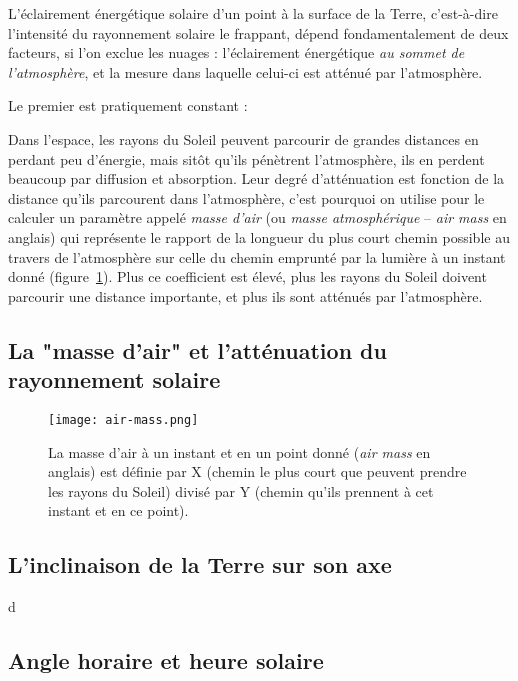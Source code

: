 \documentclass[12pt]{article}
\begin{document}
L'éclairement énergétique solaire d'un point à la surface de la Terre, c'est-à-dire l'intensité du rayonnement solaire le frappant, dépend fondamentalement de deux facteurs, si l'on exclue les nuages : l'éclairement énergétique \emph{au sommet de l'atmosphère}, et la mesure dans laquelle celui-ci est atténué par l'atmosphère.

Le premier est pratiquement constant : 

Dans l'espace, les rayons du Soleil peuvent parcourir de grandes distances en perdant peu d'énergie, mais sitôt qu'ils pénètrent l'atmosphère, ils en perdent beaucoup par diffusion et absorption.
Leur degré d'atténuation est fonction de la distance qu'ils parcourent dans l'atmosphère, c'est pourquoi on utilise pour le calculer un paramètre appelé \emph{masse d'air} (ou \emph{masse atmosphérique} -- \textit{air mass} en anglais) \cite{air_mass_wiki} qui représente le rapport de la longueur du plus court chemin possible au travers de l'atmosphère sur celle du chemin emprunté par la lumière à un instant donné (figure~\ref{fig:air-mass}). Plus ce coefficient est élevé, plus les rayons du Soleil doivent parcourir une distance importante, et plus ils sont atténués par l'atmosphère.

\subsection{La "masse d'air" et l'atténuation du rayonnement solaire}


\begin{figure}[!ht]
	\centerline{\texttt{[image: air-mass.png]}}
	\caption{La masse d'air à un instant et en un point donné (\textit{air mass} en anglais) est définie par X (chemin le plus court que peuvent prendre les rayons du Soleil) divisé par Y (chemin qu'ils prennent à cet instant et en ce point).}
	\label{fig:air-mass}
\end{figure}






\subsection{L'inclinaison de la Terre sur son axe}

d


\subsection{Angle horaire et heure solaire}
\end{document}
